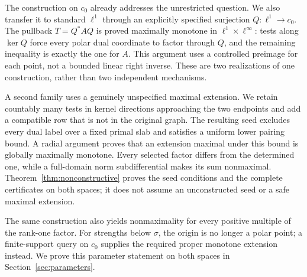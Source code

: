 \documentclass[11pt]{article}
\begin{document}
The construction on $c_0$ already addresses the unrestricted question.
\ifdefined\expandedversion
We also transfer it to standard $\ell^1$ through an explicitly specified
surjection $Q:\ell^1\to c_0$. The pullback $T=Q^*AQ$ is proved maximally
monotone in $\ell^1\times\ell^\infty$: tests along $\ker Q$ force every
polar dual coordinate to factor through $Q$, and the remaining inequality
is exactly the one for $A$. This argument uses a controlled preimage for
each point, not a bounded linear right inverse.
These are two realizations of one construction, rather than two independent
mechanisms.

A second family uses a genuinely unspecified maximal extension.
We retain countably many tests in kernel directions approaching the two endpoints
and add a compatible row that is not in the original graph. The resulting
seed excludes every dual label over a fixed primal slab and satisfies a
uniform lower pairing bound. A radial argument proves that an extension
maximal under this bound is globally maximally monotone. Every selected
factor differs from the determined one, while a full-domain norm
subdifferential makes its sum nonmaximal. Theorem~\ref{thm:nonconstructive}
proves the seed conditions and the complete certificates on both spaces;
it does not assume an unconstructed seed or a safe maximal extension.

The same construction also yields nonmaximality for every positive
multiple of the rank-one factor. For strengths below $\sigma$, the origin
is no longer a polar point; a finite-support query on $c_0$ supplies the required
proper monotone extension instead. We prove this parameter statement
on both spaces in Section~\ref{sec:parameters}.
\end{document}
